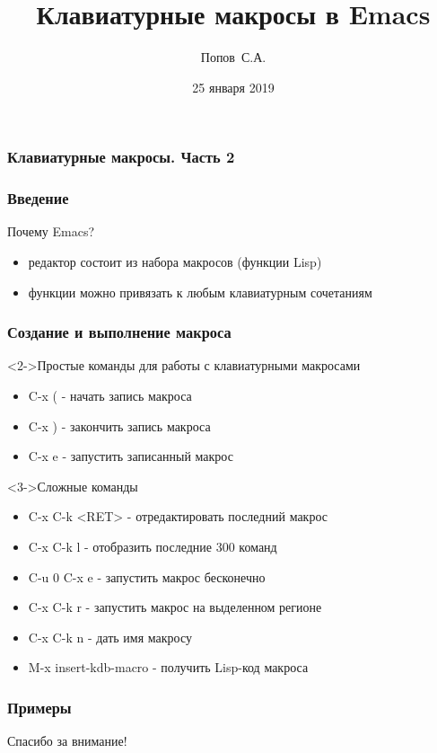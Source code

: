 \documentclass[russian,utf8]{beamer}
\title{Клавиатурные макросы в Emacs}
\author{Попов~С.А.}
\date{25 января 2019}
\begin{document}
\begin{frame}
  \frametitle{Клавиатурные макросы. Часть 2}
  \titlepage
\end{frame}

\begin{frame}
  \frametitle{Введение}
  \begin{block}{Почему Emacs?}
  \begin{itemize}
    \item<2-> редактор состоит из набора макросов (функции Lisp)
    \item<3-> функции можно привязать к любым клавиатурным сочетаниям
  \end{itemize}
  \end{block}
\end{frame}


\begin{frame}
  \frametitle{Создание и выполнение макроса}
  \begin{block}<2->{Простые команды для работы с клавиатурными макросами}
    \begin{itemize}
    \item C-x ( - начать запись макроса
    \item C-x ) - закончить запись макроса
    \item C-x e - запустить записанный макрос
    \end{itemize}
  \end{block}
  \begin{block}<3->{Сложные команды}
    \begin{itemize}
    \item C-x C-k <RET> - отредактировать последний макрос
    \item C-x C-k l - отобразить последние 300 команд
    \item C-u 0 C-x e - запустить макрос бесконечно
    \item C-x C-k r - запустить макрос на выделенном регионе
    \item C-x C-k n - дать имя макросу
    \item M-x insert-kdb-macro - получить Lisp-код макроса
    \end{itemize}
  \end{block}
\end{frame}

\begin{frame}
  \frametitle{Примеры}
\end{frame}

\begin{frame}
  Спасибо за внимание!
\end{frame}
\end{document}
